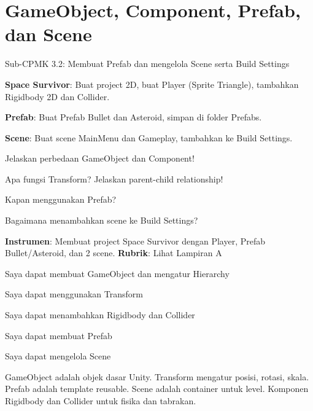 \documentclass[../main]{subfiles}
\begin{document}
\chapter{GameObject, Component, Prefab, dan Scene}

\begin{subcpmk}
  \item Sub-CPMK 3.2: Membuat Prefab dan mengelola Scene serta Build Settings
\end{subcpmk}




\begin{aktivitas}
  \item \textbf{Space Survivor}: Buat project 2D, buat Player (Sprite Triangle), tambahkan Rigidbody 2D dan Collider.
  \item \textbf{Prefab}: Buat Prefab Bullet dan Asteroid, simpan di folder Prefabs.
  \item \textbf{Scene}: Buat scene MainMenu dan Gameplay, tambahkan ke Build Settings.
\end{aktivitas}

\begin{latihan}
  \item Jelaskan perbedaan GameObject dan Component!
  \item Apa fungsi Transform? Jelaskan parent-child relationship!
  \item Kapan menggunakan Prefab?
  \item Bagaimana menambahkan scene ke Build Settings?
\end{latihan}

\begin{asesmen}
\textbf{Instrumen}: Membuat project Space Survivor dengan Player, Prefab Bullet/Asteroid, dan 2 scene.
\textbf{Rubrik}: Lihat Lampiran A
\end{asesmen}

\begin{checklist}
  \item Saya dapat membuat GameObject dan mengatur Hierarchy
  \item Saya dapat menggunakan Transform
  \item Saya dapat menambahkan Rigidbody dan Collider
  \item Saya dapat membuat Prefab
  \item Saya dapat mengelola Scene
\end{checklist}

\begin{rangkuman}
GameObject adalah objek dasar Unity. Transform mengatur posisi, rotasi, skala. Prefab adalah template reusable. Scene adalah container untuk level. Komponen Rigidbody dan Collider untuk fisika dan tabrakan.
\end{rangkuman}

\ifSubfilesClassLoaded{
  \renewcommand{\bibname}{Daftar Pustaka}
  
  
}{}
\end{document}
